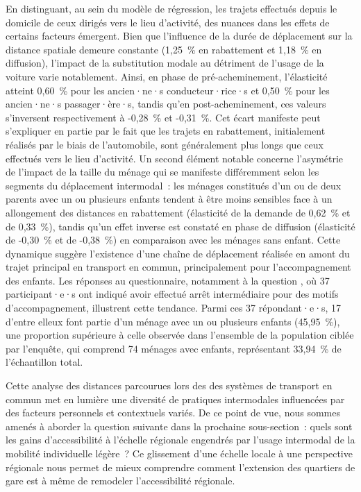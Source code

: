 \begin{refsegment}
En distinguant, au sein du modèle de régression, les trajets effectués depuis le domicile de ceux dirigés vers le lieu d'activité, des nuances dans les effets de certains facteurs émergent. Bien que l'influence de la durée de déplacement sur la distance spatiale demeure constante (1,25~\% en rabattement et 1,18~\% en diffusion), l'impact de la substitution modale au détriment de l'usage de la voiture varie notablement. Ainsi, en phase de pré-acheminement, l'élasticité atteint 0,60~\% pour les ancien·ne·s conducteur·rice·s et 0,50~\% pour les ancien·ne·s passager·ère·s, tandis qu'en post-acheminement, ces valeurs s'inversent respectivement à -0,28~\% et -0,31~\%. Cet écart manifeste peut s'expliquer en partie par le fait que les trajets en rabattement, initialement réalisés par le biais de l'automobile, sont généralement plus longs que ceux effectués vers le lieu d'activité. Un second élément notable concerne l'asymétrie de l'impact de la taille du ménage qui se manifeste différemment selon les segments du déplacement intermodal~: les ménages constitués d'un ou de deux parents avec un ou plusieurs enfants tendent à être moins sensibles face à un allongement des distances en rabattement (élasticité de la demande de 0,62~\% et de 0,33~\%), tandis qu'un effet inverse est constaté en phase de diffusion (élasticité de -0,30~\% et de -0,38~\%) en comparaison avec les ménages sans enfant. Cette dynamique suggère l'existence d'une chaîne de déplacement réalisée en amont du trajet principal en transport en commun, principalement pour l'accompagnement des enfants. Les réponses au questionnaire, notamment à la question , où 37 participant·e·s ont indiqué avoir effectué arrêt intermédiaire pour des motifs d'accompagnement, illustrent cette tendance. Parmi ces 37 répondant·e·s, 17 d'entre elleux font partie d'un ménage avec un ou plusieurs enfants (45,95~\%), une proportion supérieure à celle observée dans l'ensemble de la population ciblée par l'enquête, qui comprend 74 ménages avec enfants, représentant 33,94~\% de l'échantillon total.%

Cette analyse des distances parcourues lors des  des systèmes de transport en commun met en lumière une diversité de pratiques intermodales influencées par des facteurs personnels et contextuels variés. De ce point de vue, nous sommes amenés à aborder la question suivante dans la prochaine sous-section~: quels sont les gains d'accessibilité à l'échelle régionale engendrés par l'usage intermodal de la mobilité individuelle légère~? Ce glissement d'une échelle locale à une perspective régionale nous permet de mieux comprendre comment l'extension des quartiers de gare est à même de remodeler l'accessibilité régionale.%
    

\end{refsegment}
